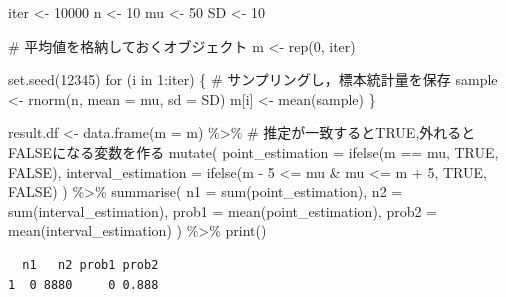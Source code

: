 \documentclass[
  a4paper,
]{book}
\newenvironment{Shaded}{\begin{snugshade}}{\end{snugshade}}
\newcommand{\AttributeTok}[1]{\textcolor[rgb]{0.40,0.45,0.13}{#1}}
\newcommand{\CommentTok}[1]{\textcolor[rgb]{0.37,0.37,0.37}{#1}}
\newcommand{\ConstantTok}[1]{\textcolor[rgb]{0.56,0.35,0.01}{#1}}
\newcommand{\ControlFlowTok}[1]{\textcolor[rgb]{0.00,0.23,0.31}{#1}}
\newcommand{\DecValTok}[1]{\textcolor[rgb]{0.68,0.00,0.00}{#1}}
\newcommand{\FunctionTok}[1]{\textcolor[rgb]{0.28,0.35,0.67}{#1}}
\newcommand{\NormalTok}[1]{\textcolor[rgb]{0.00,0.23,0.31}{#1}}
\newcommand{\OtherTok}[1]{\textcolor[rgb]{0.00,0.23,0.31}{#1}}
\newcommand{\SpecialCharTok}[1]{\textcolor[rgb]{0.37,0.37,0.37}{#1}}
\begin{document}
\begin{Shaded}
\begin{Highlighting}[]
\NormalTok{iter }\OtherTok{\textless{}{-}} \DecValTok{10000}
\NormalTok{n }\OtherTok{\textless{}{-}} \DecValTok{10}
\NormalTok{mu }\OtherTok{\textless{}{-}} \DecValTok{50}
\NormalTok{SD }\OtherTok{\textless{}{-}} \DecValTok{10}

\CommentTok{\# 平均値を格納しておくオブジェクト}
\NormalTok{m }\OtherTok{\textless{}{-}} \FunctionTok{rep}\NormalTok{(}\DecValTok{0}\NormalTok{, iter)}

\FunctionTok{set.seed}\NormalTok{(}\DecValTok{12345}\NormalTok{)}
\ControlFlowTok{for}\NormalTok{ (i }\ControlFlowTok{in} \DecValTok{1}\SpecialCharTok{:}\NormalTok{iter) \{}
  \CommentTok{\# サンプリングし，標本統計量を保存}
\NormalTok{  sample }\OtherTok{\textless{}{-}} \FunctionTok{rnorm}\NormalTok{(n, }\AttributeTok{mean =}\NormalTok{ mu, }\AttributeTok{sd =}\NormalTok{ SD)}
\NormalTok{  m[i] }\OtherTok{\textless{}{-}} \FunctionTok{mean}\NormalTok{(sample)}
\NormalTok{\}}

\NormalTok{result.df }\OtherTok{\textless{}{-}} \FunctionTok{data.frame}\NormalTok{(}\AttributeTok{m =}\NormalTok{ m) }\SpecialCharTok{\%\textgreater{}\%}
  \CommentTok{\# 推定が一致するとTRUE,外れるとFALSEになる変数を作る}
  \FunctionTok{mutate}\NormalTok{(}
    \AttributeTok{point\_estimation =} \FunctionTok{ifelse}\NormalTok{(m }\SpecialCharTok{==}\NormalTok{ mu, }\ConstantTok{TRUE}\NormalTok{, }\ConstantTok{FALSE}\NormalTok{),}
    \AttributeTok{interval\_estimation =} \FunctionTok{ifelse}\NormalTok{(m }\SpecialCharTok{{-}} \DecValTok{5} \SpecialCharTok{\textless{}=}\NormalTok{ mu }\SpecialCharTok{\&}\NormalTok{ mu }\SpecialCharTok{\textless{}=}\NormalTok{ m }\SpecialCharTok{+} \DecValTok{5}\NormalTok{, }\ConstantTok{TRUE}\NormalTok{, }\ConstantTok{FALSE}\NormalTok{)}
\NormalTok{  ) }\SpecialCharTok{\%\textgreater{}\%}
  \FunctionTok{summarise}\NormalTok{(}
    \AttributeTok{n1 =} \FunctionTok{sum}\NormalTok{(point\_estimation),}
    \AttributeTok{n2 =} \FunctionTok{sum}\NormalTok{(interval\_estimation),}
    \AttributeTok{prob1 =} \FunctionTok{mean}\NormalTok{(point\_estimation),}
    \AttributeTok{prob2 =} \FunctionTok{mean}\NormalTok{(interval\_estimation)}
\NormalTok{  ) }\SpecialCharTok{\%\textgreater{}\%}
  \FunctionTok{print}\NormalTok{()}
\end{Highlighting}
\end{Shaded}

\begin{verbatim}
  n1   n2 prob1 prob2
1  0 8880     0 0.888
\end{verbatim}
\end{document}
